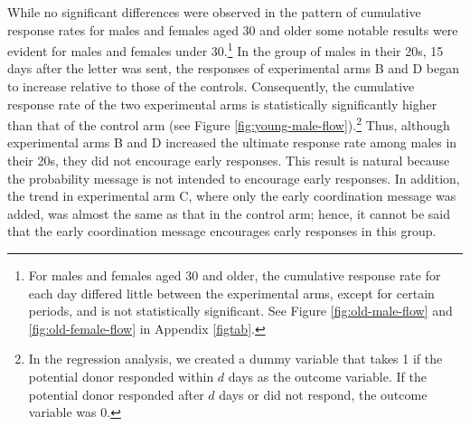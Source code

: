 \documentclass[12pt, a4paper]{article}
\begin{document}
While no significant differences were observed in the pattern of cumulative response rates for males and females aged 30 and older some notable results were evident for males and females under 30.\footnote{For males and females aged 30 and older, the cumulative response rate for each day differed little between the experimental arms, except for certain periods, and is not statistically significant. See Figure \ref{fig:old-male-flow} and \ref{fig:old-female-flow} in Appendix \ref{figtab}.} In the group of males in their 20s, 15 days after the letter was sent, the responses of experimental arms B and D began to increase relative to those of the controls. Consequently, the cumulative response rate of the two experimental arms is statistically significantly higher than that of the control arm (see Figure \ref{fig:young-male-flow}).\footnote{In the regression analysis, we created a dummy variable that takes 1 if the potential donor responded within \(d\) days as the outcome variable. If the potential donor responded after \(d\) days or did not respond, the outcome variable was 0.} Thus, although experimental arms B and D increased the ultimate response rate among males in their 20s, they did not encourage early responses. This result is natural because the probability message is not intended to encourage early responses. In addition, the trend in experimental arm C, where only the early coordination message was added, was almost the same as that in the control arm; hence, it cannot be said that the early coordination message encourages early responses in this group.
\end{document}
